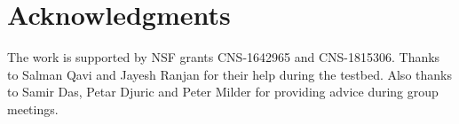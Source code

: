 \section*{Acknowledgments}

The work is supported by NSF grants CNS-1642965 and CNS-1815306. 
Thanks to Salman Qavi and Jayesh Ranjan for their help during the testbed.
Also thanks to Samir Das, Petar Djuric and Peter Milder for providing advice during group meetings.


